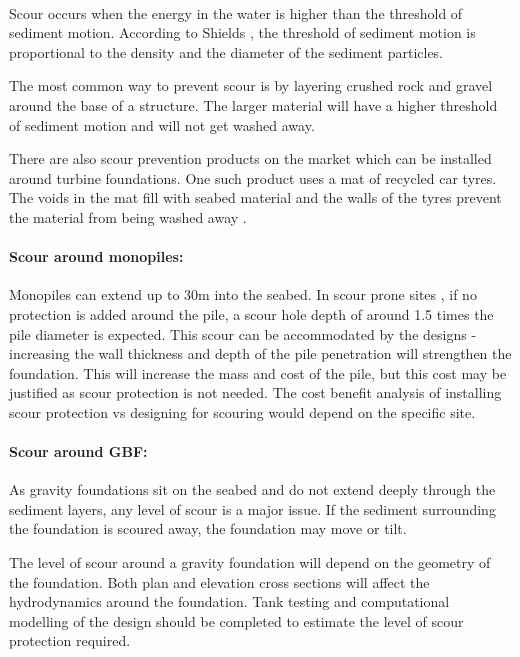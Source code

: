 \documentclass[12pt]{article} %
\begin{document}
\paragraph{}
Scour occurs when the energy in the water is higher than the threshold of sediment motion.
According to Shields \cite{shields_application_1936}, the threshold of sediment motion is proportional to the density and the diameter of the sediment particles.

The most common way to prevent scour is by layering crushed rock and gravel around the base of a structure. The larger material will have a higher threshold of sediment motion and will not get washed away.

There are also scour prevention products on the market which can be installed around turbine foundations. One such product uses a mat of recycled car tyres. The voids in the mat fill with seabed material and the walls of the tyres prevent the material from being washed away \cite{tyres}.

\paragraph{Scour around monopiles:}
Monopiles can extend up to 30m into the seabed. In scour prone sites , if no protection is added around the pile, a scour hole depth of around 1.5 times the pile diameter is expected.
This scour can be accommodated by the designs - increasing the wall thickness and depth of the pile penetration will strengthen the foundation\cite{zaaijer}. This will increase the mass and cost of the pile, but this cost may be justified as scour protection is not needed. The cost benefit analysis of installing scour protection vs designing for scouring would depend on the specific site.

\paragraph{Scour around GBF:}
As gravity foundations sit on the seabed and do not extend deeply through the sediment layers, any level of scour is a major issue.
If the sediment surrounding the foundation is scoured away, the foundation may move or tilt.

The level of scour around a gravity foundation will depend on the geometry of the foundation. Both plan and elevation cross sections will affect the hydrodynamics around the foundation. Tank testing and computational modelling of the design should be completed to estimate the level of scour protection required.
\end{document}
